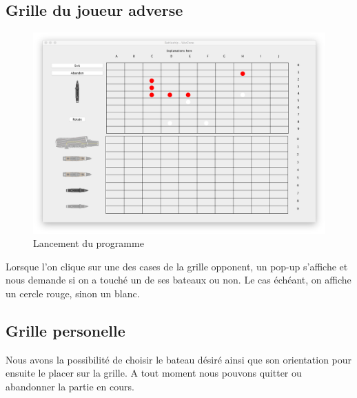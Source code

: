 \documentclass[a4paper,10pt]{article}
\begin{document}
\subsection{Grille du joueur adverse}

\begin{figure}[H]
    \center
    \includegraphics[scale=0.35]{images/encours}
    \caption{Lancement du programme}
    \label{fig:my_label}
\end{figure}

Lorsque l'on clique sur une des cases de la grille opponent, un pop-up s'affiche et nous demande si on a touché un de ses bateaux ou non. Le cas échéant, on affiche un cercle rouge, sinon un blanc.

\subsection{Grille personelle}

Nous avons la possibilité de choisir le bateau désiré ainsi que son orientation pour ensuite le placer sur la grille.
A tout moment nous pouvons quitter ou abandonner la partie en cours.

\newpage
\end{document}
